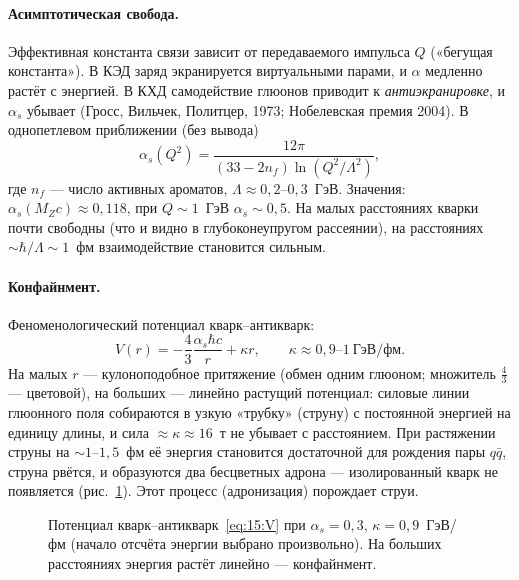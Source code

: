 \paragraph{Асимптотическая свобода.} Эффективная константа связи зависит от передаваемого импульса $Q$
(«бегущая константа»). В КЭД заряд экранируется виртуальными парами, и $\alpha$ медленно растёт с энергией. В КХД
самодействие глюонов приводит к \emph{антиэкранировке}, и $\alpha_s$ убывает (Гросс, Вильчек, Политцер, 1973;
Нобелевская премия 2004). В однопетлевом приближении (без вывода)
\begin{equation}\label{eq:15:alphas}
  \alpha_s(Q^2)=\frac{12\pi}{(33-2n_f)\ln(Q^2/\Lambda^2)},
\end{equation}
где $n_f$ — число активных ароматов, $\Lambda\approx0{,}2$--$0{,}3$~ГэВ. Значения: $\alpha_s(M_Zc)\approx0{,}118$, при $Q\sim1$~ГэВ
$\alpha_s\sim0{,}5$. На малых расстояниях кварки почти свободны (что и видно в глубоконеупругом рассеянии), на расстояниях
$\sim\hbar/\Lambda\sim1$~фм взаимодействие становится сильным.

\paragraph{Конфайнмент.} Феноменологический потенциал кварк--антикварк:
\begin{equation}\label{eq:15:V}
  V(r)=-\frac43\frac{\alpha_s\hbar c}{r}+\kappa r,\qquad \kappa\approx0{,}9\text{--}1\ \text{ГэВ/фм}.
\end{equation}
На малых $r$ — кулоноподобное притяжение (обмен одним глюоном; множитель $\frac43$ — цветовой), на больших —
линейно растущий потенциал: силовые линии глюонного поля собираются в узкую «трубку» (струну) с постоянной
энергией на единицу длины, и сила $\approx\kappa\approx16$~т не убывает с расстоянием. При растяжении струны на
$\sim1$--$1{,}5$~фм её энергия становится достаточной для рождения пары $q\bar q$, струна рвётся, и образуются два
бесцветных адрона — изолированный кварк не появляется (рис.~\ref{fig:15:V}). Этот процесс (адронизация) порождает струи.

\begin{figure}[htbp]
\centering
{}
\caption{Потенциал кварк--антикварк~\eqref{eq:15:V} при $\alpha_s=0{,}3$, $\kappa=0{,}9$~ГэВ/фм (начало отсчёта энергии
выбрано произвольно). На больших расстояниях энергия растёт линейно — конфайнмент.}
\label{fig:15:V}
\end{figure}

